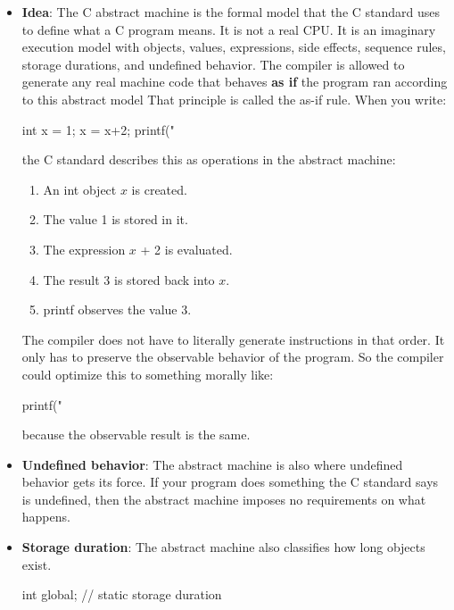 \documentclass{report}
\begin{document}
        \pagebreak 
        \begin{itemize}
            \item \textbf{Idea}: The C abstract machine is the formal model that the C standard uses to define what a C program means.
                \bigbreak \noindent 
                It is not a real CPU. It is an imaginary execution model with objects, values, expressions, side effects, sequence rules, storage durations, and undefined behavior. The compiler is allowed to generate any real machine code that behaves \textbf{as if} the program ran according to this abstract model
                \bigbreak \noindent 
                That principle is called the as-if rule.
                \bigbreak \noindent 
                When you write:
                \bigbreak \noindent 
                \begin{cppcode}
                int x = 1;
                x = x+2;
                printf("%
                \end{cppcode}
                \bigbreak \noindent 
                the C standard describes this as operations in the abstract machine:
                \begin{enumerate}
                    \item An int object $x$ is created.
                    \item The value 1 is stored in it.
                    \item The expression $x$ + 2 is evaluated.
                    \item The result 3 is stored back into $x$.
                    \item printf observes the value 3.
                \end{enumerate}
                The compiler does not have to literally generate instructions in that order. It only has to preserve the observable behavior of the program.
                \bigbreak \noindent 
                So the compiler could optimize this to something morally like:
                \bigbreak \noindent 
                \begin{cppcode}
                printf("%
                \end{cppcode}
                \bigbreak \noindent 
                because the observable result is the same.
            \item \textbf{Undefined behavior}: The abstract machine is also where undefined behavior gets its force.
                \bigbreak \noindent 
                If your program does something the C standard says is undefined, then the abstract machine imposes no requirements on what happens.
            \item \textbf{Storage duration}: The abstract machine also classifies how long objects exist.
                \bigbreak \noindent 
                \begin{cppcode}
                    int global;              // static storage duration


\end{cppcode}
\end{itemize}
\end{document}
